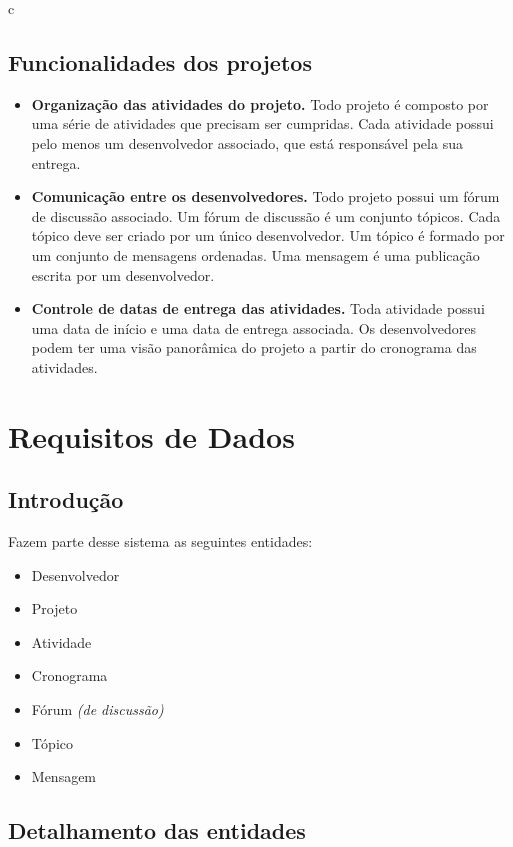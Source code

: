 c\documentclass{article}
\begin{document}
	\subsection{Funcionalidades dos projetos}
	\begin{itemize}
		\item \textbf{Organização das atividades do projeto.} Todo projeto é composto por uma série de atividades que precisam ser cumpridas. Cada atividade possui pelo menos um desenvolvedor associado, que está responsável pela sua entrega.

		\item \textbf{Comunicação entre os desenvolvedores.} Todo projeto possui um fórum de discussão associado. Um fórum de discussão é um conjunto tópicos. Cada tópico deve ser criado por um único desenvolvedor. Um tópico é formado por um conjunto de mensagens ordenadas. Uma mensagem é uma publicação escrita por um desenvolvedor.

		\item \textbf{Controle de datas de entrega das atividades.} Toda atividade possui uma data de início e uma data de entrega associada. Os desenvolvedores podem ter uma visão panorâmica do projeto a partir do cronograma das atividades.
	\end{itemize}


\section{Requisitos de Dados}

	\subsection{Introdução}
	Fazem parte desse sistema as seguintes entidades:
	\begin{itemize}
		\item Desenvolvedor
		\item Projeto
		\item Atividade
		\item Cronograma
		\item Fórum \textit{(de discussão)}
		\item Tópico
		\item Mensagem
	\end{itemize}

	\subsection{Detalhamento das entidades}
\end{document}
